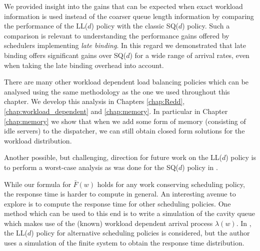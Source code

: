\documentclass[12pt]{report}
\begin{document}
We provided insight into the gains that can be expected when exact
workload information is used instead of the coarser queue length information by comparing the performance of the LL($d$) policy 
with the classic SQ($d$) policy. Such a comparison is 
relevant to understanding the performance gains offered by schedulers implementing {\it late binding}. 
In  this regard we demonstrated that 
late binding offers significant gains over SQ($d$) for a wide range of arrival rates, even when taking
the late binding overhead into account.

There are many other workload dependent load balancing policies which can be analysed using the same methodology as the one we used throughout this chapter. We develop this analysis in Chapters \ref{chap:Redd}, \ref{chap:workload_dependent} and \ref{chap:memory}. In particular in Chapter \ref{chap:memory} we show that when we add some form of memory (consisting of idle servers) to the dispatcher, we can still obtain closed form solutions for the workload distribution.

Another possible, but challenging, direction for future work on the LL($d$) policy is to perform a worst-case analysis 
as was done for the SQ($d$) policy in \cite{azar1}. 

While our formula for $\bar F(w)$ holds for any work conserving scheduling policy, the response time is harder to compute in general. An interesting avenue to explore is to compute the response time for other scheduling policies. One method which can be used to this end is to write a simulation of the cavity queue which makes use of the (known) workload dependent arrival process $\lambda(w)$. In \cite{mitzenmacher2019supermarket}, the LL($d$) policy for alternative scheduling policies is considered, but the author uses a simulation of the finite system to obtain the response time distribution.
\end{document}
